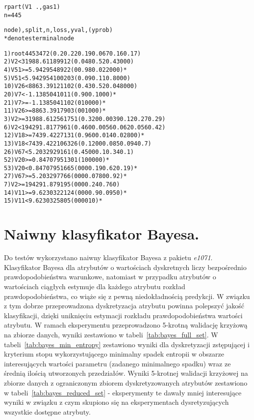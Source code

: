 \newpage
\begin{alltt}
rpart(V1 ~ ., gas1)
n= 445 

node), split, n, loss, yval, (yprob)
      * denotes terminal node

 1) root 445 347 2 (0.2 0.22 0.19 0.067 0.16 0.17)  
   2) V2< 31988.61 189  91 2 (0.048 0.52 0.43 0 0 0)  
     4) V51>=5.942954 89   2 2 (0 0.98 0.022 0 0 0) *
     5) V51< 5.942954 100  20 3 (0.09 0.11 0.8 0 0 0)  
      10) V26< 8863.391 21  10 2 (0.43 0.52 0.048 0 0 0)  
        20) V7< -1.138504 10   1 1 (0.9 0 0.1 0 0 0) *
        21) V7>=-1.138504 11   0 2 (0 1 0 0 0 0) *
      11) V26>=8863.391 79   0 3 (0 0 1 0 0 0) *
   3) V2>=31988.61 256 175 1 (0.32 0 0.0039 0.12 0.27 0.29)  
     6) V2< 194291.8 177  96 1 (0.46 0 0.0056 0.062 0.056 0.42)  
      12) V18>=7439.422 71   3 1 (0.96 0 0.014 0.028 0 0) *
      13) V18< 7439.422 106  32 6 (0.12 0 0 0.085 0.094 0.7)  
        26) V67< 5.20329 29  16 1 (0.45 0 0 0.1 0.34 0.1)  
          52) V20>=0.8470795 13   0 1 (1 0 0 0 0 0) *
          53) V20< 0.8470795 16   6 5 (0 0 0 0.19 0.62 0.19) *
        27) V67>=5.20329 77   6 6 (0 0 0 0.078 0 0.92) *
     7) V2>=194291.8 79  19 5 (0 0 0 0.24 0.76 0)  
      14) V11>=9.623032 21   2 4 (0 0 0 0.9 0.095 0) *
      15) V11< 9.623032 58   0 5 (0 0 0 0 1 0) *
\end{alltt}



\section{Naiwny klasyfikator Bayesa.}
Do testów wykorzystano naiwny klasyfikator Bayesa z pakietu \emph{e1071}. Klasyfikator Bayesa dla atrybutów o wartościach dyskretnych liczy bezpośrednio prawdopodobieństwa warunkowe, natomiast w przypadku atrybutów o wartościach ciągłych estymuje dla każdego atrybutu rozkład prawdopodobieństwa, co wiąże się z pewną niedokładnością predykcji. W związku z tym dobrze przeprowadzona dyskretyzacja atrybutu powinna polepszyć jakość klasyfikacji, dzięki uniknięciu estymacji rozkładu prawdopodobieństwa wartości atrybutu. W ramach eksperymentu przeprowadzono 5-krotną walidację krzyżową na zbiorze danych, wyniki zestawiono w tabeli~\ref{tab:bayes_full_set}. W tabeli~\ref{tab:bayes_min_entropy} zestawiono wyniki dla dyskretyzacji zstępującej i kryterium stopu wykorzystującego minimalny spadek entropii w obszarze interesujących wartości parametru (zadanego minimalnego spadku) wraz ze średnią ilością utworzonych przedziałów. Wyniki 5-krotnej walidacji krzyżowej na zbiorze danych z ograniczonym zbiorem dyskretyzowanych atrybutów zestawiono w tabeli~\ref{tab:bayes_reduced_set} - eksperymenty te dawały mniej interesujące wyniki w związku z czym skupiono się na eksperymentach dysretyzujących wszystkie dostępne atrybuty.

